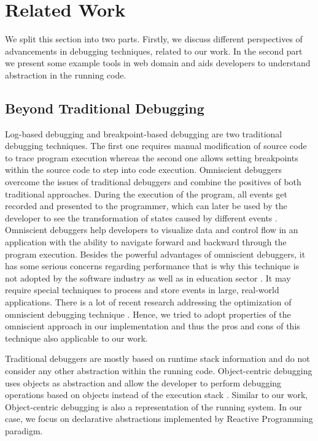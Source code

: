 \section{Related Work}
We split this section into two parts. Firstly, we discuss different perspectives of advancements in debugging techniques, related to our work. In the second part we present some example tools in web domain and aids developers to understand abstraction in the running code.
\subsection{Beyond Traditional Debugging}
Log-based debugging and breakpoint-based debugging are two traditional debugging techniques. The first one requires manual modification of source code to trace program execution whereas the second one allows setting breakpoints within the source code to step into code execution. Omniscient debuggers overcome the issues of traditional debuggers and combine the positives of both traditional approaches. During the execution of the program, all events get recorded and presented to the programmer, which can later be used by the developer to see the transformation of states caused by different events \cite{Pothier:2007:SOD:1297105.1297067}. Omniscient debuggers help developers to visualize data and control flow in an application with the ability to navigate forward and backward through the program execution. Besides the powerful advantages of omniscient debuggers, it has some serious concerns regarding performance that is why this technique is not adopted by the software industry as well as in education sector \cite{6983851}. It may require special techniques to process and store events in large, real-world applications. There is a lot of recent research addressing the optimization of omniscient debugging technique  \cite{Pothier:2007:SOD:1297105.1297067,Pothier2011,Lienhard2008}.
Hence, we tried to adopt properties of the omniscient approach in our implementation and thus the pros and cons of this technique also applicable to our work.

Traditional debuggers are mostly based on runtime stack information and do not consider any other abstraction within the running code. Object-centric debugging uses objects as abstraction and allow the developer to perform debugging operations based on objects instead of the execution stack \cite{Ressia:2012:OD:2337223.2337280}. Similar to our work, Object-centric debugging is also a representation of the running system. In our case, we focus on declarative abstractions implemented by Reactive Programming paradigm.

